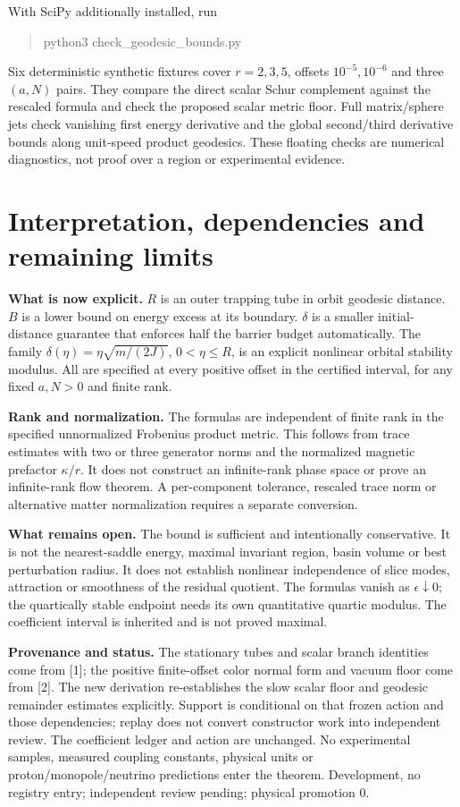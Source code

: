\documentclass[11pt,a4paper]{article}
\begin{document}
With SciPy additionally installed, run
\begin{quote}\ttfamily python3 check\_geodesic\_bounds.py\end{quote}
Six deterministic synthetic fixtures cover $r=2,3,5$, offsets $10^{-5},10^{-6}$ and three $(a,N)$ pairs. They compare the direct scalar Schur complement against the rescaled formula and check the proposed scalar metric floor. Full matrix/sphere jets check vanishing first energy derivative and the global second/third derivative bounds along unit-speed product geodesics. These floating checks are numerical diagnostics, not proof over a region or experimental evidence.
\newpage
\section{Interpretation, dependencies and remaining limits}
\textbf{What is now explicit.} $R$ is an outer trapping tube in orbit geodesic distance. $B$ is a lower bound on energy excess at its boundary. $\delta$ is a smaller initial-distance guarantee that enforces half the barrier budget automatically. The family $\delta(\eta)=\eta\sqrt{m/(2J)}$, $0<\eta\le R$, is an explicit nonlinear orbital stability modulus. All are specified at every positive offset in the certified interval, for any fixed $a,N>0$ and finite rank.

\textbf{Rank and normalization.} The formulas are independent of finite rank in the specified unnormalized Frobenius product metric. This follows from trace estimates with two or three generator norms and the normalized magnetic prefactor $\kappa/r$. It does not construct an infinite-rank phase space or prove an infinite-rank flow theorem. A per-component tolerance, rescaled trace norm or alternative matter normalization requires a separate conversion.

\textbf{What remains open.} The bound is sufficient and intentionally conservative. It is not the nearest-saddle energy, maximal invariant region, basin volume or best perturbation radius. It does not establish nonlinear independence of slice modes, attraction or smoothness of the residual quotient. The formulas vanish as $\epsilon\downarrow0$; the quartically stable endpoint needs its own quantitative quartic modulus. The coefficient interval is inherited and is not proved maximal.

\textbf{Provenance and status.} The stationary tubes and scalar branch identities come from [1]; the positive finite-offset color normal form and vacuum floor come from [2]. The new derivation re-establishes the slow scalar floor and geodesic remainder estimates explicitly. Support is conditional on that frozen action and those dependencies; replay does not convert constructor work into independent review. The coefficient ledger and action are unchanged. No experimental samples, measured coupling constants, physical units or proton/monopole/neutrino predictions enter the theorem. Development, no registry entry; independent review pending; physical promotion $0$.
\end{document}
